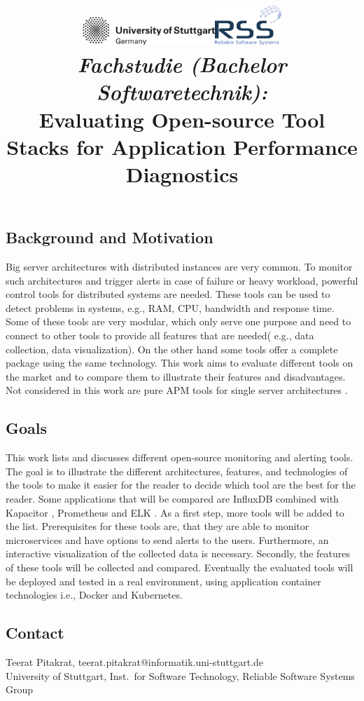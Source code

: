 \documentclass[a4paper,12pt]{article}
\date{}
\title{
\includegraphics[width=5cm]{figures/stuttgart-vector.pdf}\hfill{\includegraphics[width=2.5cm]{figures/rss_logo.pdf}}
\quad \\ [0.5cm]
{\large \textit{Fachstudie (Bachelor Softwaretechnik):}} \\ [1mm]
{\Large Evaluating Open-source Tool Stacks for Application Performance Diagnostics}
}
\begin{document}
	

\maketitle

\thispagestyle{empty}

\vspace{-2.5cm}


\subsection*{Background and Motivation}
Big server architectures with distributed instances are very common. To monitor such architectures and trigger alerts in case of failure or heavy workload, powerful control tools for distributed systems are needed. These tools can be used to detect problems in systems, e.g., RAM, CPU, bandwidth and response time. Some of these tools are very modular, which only serve one purpose and need to connect to other tools to provide all features that are needed( e.g., data collection, data visualization). On the other hand some tools offer a complete package using the same technology.
This work aims to evaluate different tools on the market and to compare them to illustrate their features and disadvantages. 
Not considered in this work are pure APM tools for single server architectures \cite{ahmed2016studying,Heger2017} .

\subsection*{Goals}
This work lists and discusses different open-source monitoring and alerting tools. The goal is to illustrate the different architectures, features, and technologies of the tools to make it easier for the reader to decide which tool are the best for the reader.
Some applications that will be compared are InfluxDB combined with Kapacitor \cite{InfluxDB}, Prometheus \cite{Prometheus}  and ELK \cite{ELK} . As a first step, more tools will be added to the list. Prerequisites for these tools are, that they are able to monitor microservices and have options to send alerts to the users. Furthermore, an interactive visualization of the collected data is necessary.
Secondly, the features of these tools will be collected and compared. Eventually the evaluated tools will be deployed and tested in a real environment, using application container technologies i.e., Docker and Kubernetes. 


\begin{scriptsize}


\end{scriptsize}

\subsection*{Contact}
Teerat Pitakrat, teerat.pitakrat@informatik.uni-stuttgart.de \\
University of Stuttgart, Inst.\ for Software Technology, Reliable Software Systems Group \\
\end{document}
